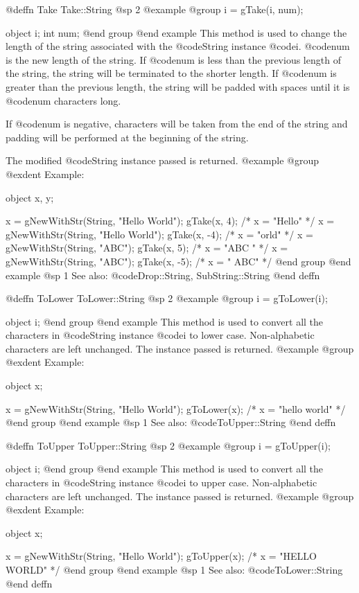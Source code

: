 @deffn {Take} Take::String
@sp 2
@example
@group
i = gTake(i, num);

object  i;
int     num;
@end group
@end example
This method is used to change the length of the string associated with
the @code{String} instance @code{i}.  @code{num} is the new length of
the string.  If @code{num} is less than the previous length of the
string, the string will be terminated to the shorter length.  If
@code{num} is greater than the previous length, the string will be padded
with spaces until it is @code{num} characters long.

If @code{num} is negative, characters will be taken from the end of the
string and padding will be performed at the beginning of the string.

The modified @code{String} instance passed is returned.
@example
@group
@exdent Example:

object  x, y;

x = gNewWithStr(String, "Hello World");
gTake(x, 4);   /*  x = "Hello"    */
x = gNewWithStr(String, "Hello World");
gTake(x, -4);   /*  x = "orld"    */
x = gNewWithStr(String, "ABC");
gTake(x, 5);   /*  x = "ABC  "    */
x = gNewWithStr(String, "ABC");
gTake(x, -5);   /*  x = "  ABC"    */
@end group
@end example
@sp 1
See also:  @code{Drop::String, SubString::String}
@end deffn















@deffn {ToLower} ToLower::String
@sp 2
@example
@group
i = gToLower(i);

object  i;
@end group
@end example
This method is used to convert all the characters in @code{String}
instance @code{i} to lower case.  Non-alphabetic characters are left
unchanged.  The instance passed is returned.
@example
@group
@exdent Example:

object  x;

x = gNewWithStr(String, "Hello World");
gToLower(x);
/*  x = "hello world"  */
@end group
@end example
@sp 1
See also:  @code{ToUpper::String}
@end deffn












@deffn {ToUpper} ToUpper::String
@sp 2
@example
@group
i = gToUpper(i);

object  i;
@end group
@end example
This method is used to convert all the characters in @code{String}
instance @code{i} to upper case.  Non-alphabetic characters are left
unchanged.  The instance passed is returned.
@example
@group
@exdent Example:

object  x;

x = gNewWithStr(String, "Hello World");
gToUpper(x);
/*  x = "HELLO WORLD"  */
@end group
@end example
@sp 1
See also:  @code{ToLower::String}
@end deffn




